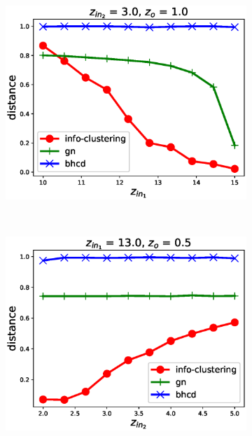 \documentclass{article}
\begin{document}
\begin{figure}
	\centering
	\begin{subfigure}{0.33\textwidth}
		\includegraphics[width=\textwidth]{pic/z_in_1.eps}
		\caption{}
	\end{subfigure}~
	\begin{subfigure}{0.33\textwidth}
		\includegraphics[width=\textwidth]{pic/z_in_2.eps}
		\caption{}
	\end{subfigure}~
	\begin{subfigure}{0.33\textwidth}

\end{subfigure}
\end{figure}
\end{document}
